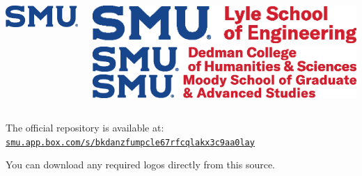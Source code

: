 \documentclass[12pt, aspectratio=169]{beamer}
\begin{document}
\begin{frame}{\insertsubsection}
\begin{columns}
\begin{column}{0.2\textwidth}
        \includegraphics[width=.67\textwidth]{template-source/SMU Logo_Formal_PMS_B.eps}
        \end{column}
        \begin{column}{0.4\textwidth}
        \includegraphics[height=0.077\textheight]{template-source/Lyle_FormalHrz_PMS_BR.eps}\vspace{4pt}
        \includegraphics[height=0.07\textheight]{template-source/DedmanCollegeofHumanities&Sciences_FormalHrz_PMS_BR.eps}\vspace{4pt}
        \includegraphics[height=0.07\textheight]{template-source/Moody_FormalHrz_PMS_BR.eps}    
        \end{column}
    \end{columns}
    \vspace{8pt}
    
    The official repository is available at:\\
    \centering\href{https://smu.app.box.com/s/bkdanzfumpcle67rfcqlakx3c9aa0lay}{\texttt{smu.app.box.com/s/bkdanzfumpcle67rfcqlakx3c9aa0lay}}
    
    \raggedright
    You can download any required logos directly from this source.
\end{frame}
\end{document}
